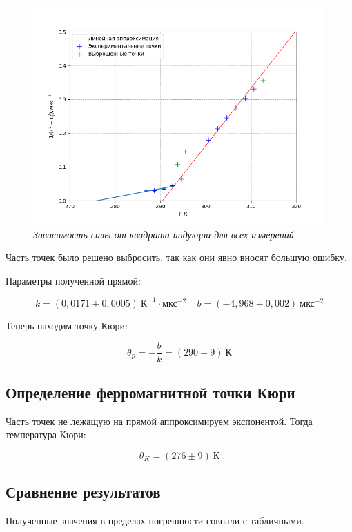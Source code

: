 \documentclass[a4paper,12pt]{article}
\begin{document}
\begin{figure}[!ht]
        \centering
	\includegraphics[width=1.0\textwidth]{tau_t.png}
	\caption{\textit{Зависимость силы от квадрата индукции для всех измерений}}
	\label{graph:1}
\end{figure}

Часть точек было решено выбросить, так как они явно вносят большую ошибку.

Параметры полученной прямой:

\begin{equation*}
    k = (0,0171 \pm 0,0005) \ \text{К}^{-1} \cdot \text{мкс}^{-2} \ \ \ \ \ b = (-4,968 \pm 0,002) \ \text{мкс}^{-2}
\end{equation*}

Теперь находим точку Кюри:

\begin{equation*}
    \theta_p = - \frac{b}{k} = (290 \pm 9) \ \text{К}
\end{equation*}

\subsection{Определение ферромагнитной точки Кюри}

Часть точек не лежащую на прямой аппроксимируем экспонентой. Тогда температура Кюри:

\begin{equation*}
    \theta_K = (276 \pm 9) \ \text{К}
\end{equation*}

\subsection{Сравнение результатов}

Полученные значения в пределах погрешности совпали с табличными.
\end{document}

